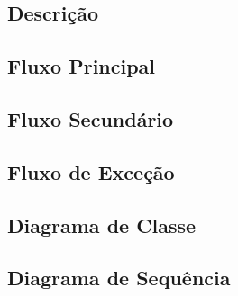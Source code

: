 \subsection{Descrição}

\subsection{Fluxo Principal}

\subsection{Fluxo Secundário}

\subsection{Fluxo de Exceção}

\subsection{Diagrama de Classe}

\subsection{Diagrama de Sequência}